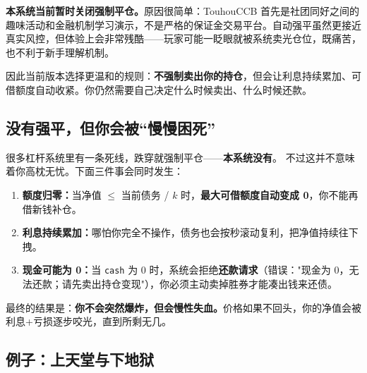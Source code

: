 \documentclass[11pt,a4paper,twoside]{article}
\begin{document}
\begin{notebox}
\textbf{本系统当前暂时关闭强制平仓。}\;原因很简单：TouhouCCB 首先是社团同好之间的趣味活动和金融机制学习演示，不是严格的保证金交易平台。自动强平虽然更接近真实风控，但体验上会非常残酷——玩家可能一眨眼就被系统卖光仓位，既痛苦，也不利于新手理解机制。

因此当前版本选择更温和的规则：\textbf{不强制卖出你的持仓}，但会让利息持续累加、可借额度自动收紧。你仍然需要自己决定什么时候卖出、什么时候还款。
\end{notebox}

\subsection{没有强平，但你会被“慢慢困死”}

很多杠杆系统里有一条死线，跌穿就强制平仓——\textbf{本系统没有}。
不过这并不意味着你高枕无忧。下面三件事会同时发生：

\begin{enumerate}
  \item \textbf{额度归零：}当净值 $\leq$ 当前债务 / $k$ 时，\textbf{最大可借额度自动变成 0}，你不能再借新钱补仓。
  \item \textbf{利息持续累加：}哪怕你完全不操作，债务也会按秒滚动复利，把净值持续往下拽。
  \item \textbf{现金可能为 0：}当 \texttt{cash} 为 0 时，系统会拒绝\textbf{还款请求}（错误："现金为 0，无法还款；请先卖出持仓变现"），你必须主动卖掉胜券才能凑出钱来还债。
\end{enumerate}

最终的结果是：\textbf{你不会突然爆炸，但会慢性失血。}\;价格如果不回头，你的净值会被利息+亏损逐步咬光，直到所剩无几。

\subsection{例子：上天堂与下地狱}
\end{document}
